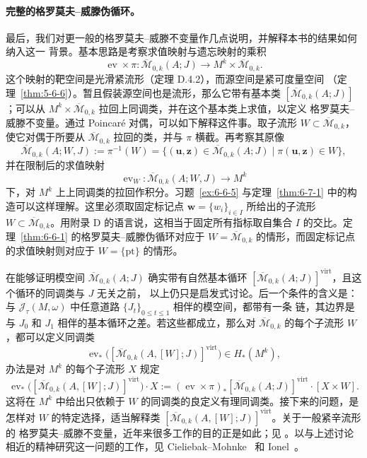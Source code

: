 \paragraph{完整的格罗莫夫--威滕伪循环。}
最后，我们对更一般的格罗莫夫--威滕不变量作几点说明，并解释本书的结果如何纳入这一
背景。基本思路是考察求值映射与遗忘映射的乘积
\[
  \operatorname{ev}\times\pi:
  \overline{\mathcal M}_{0,k}(A;J)
  \longrightarrow M^k\times\overline{\mathcal M}_{0,k}.
\]
这个映射的靶空间是光滑紧流形（定理 D.4.2），而源空间是紧可度量空间
（定理~\ref{thm:5-6-6}）。暂且假装源空间也是流形，那么它带有基本类
$[\overline{\mathcal M}_{0,k}(A;J)]$；可以从
$M^k\times\overline{\mathcal M}_{0,k}$ 拉回上同调类，并在这个基本类上求值，以定义
格罗莫夫--威滕不变量。通过 Poincaré 对偶，可以如下解释这件事。取子流形
$W\subset\overline{\mathcal M}_{0,k}$，使它对偶于所要从
$\overline{\mathcal M}_{0,k}$ 拉回的类，并与 $\pi$ 横截。再考察其原像
\[
  \overline{\mathcal M}_{0,k}(A;W,J)
  :=\pi^{-1}(W)
  =\bigl\{(\mathbf u,\mathbf z)\in\overline{\mathcal M}_{0,k}(A;J)
      \mid\pi(\mathbf u,\mathbf z)\in W\bigr\},
\]
并在限制后的求值映射
\[
  \operatorname{ev}_W:\overline{\mathcal M}_{0,k}(A;W,J)\longrightarrow M^k
\]
下，对 $M^k$ 上上同调类的拉回作积分。习题~\ref{ex:6-6-5} 与定理~\ref{thm:6-7-1}
中的构造可以这样理解。这里必须取固定标记点
$\mathbf w=\{w_i\}_{i\in I}$ 所给出的子流形
$W\subset\overline{\mathcal M}_{0,k}$。用附录 D 的语言说，这相当于固定所有指标取自集合
$I$ 的交比。定理~\ref{thm:6-6-1} 的格罗莫夫--威滕伪循环对应于
$W=\overline{\mathcal M}_{0,k}$ 的情形，而固定标记点的求值映射则对应于
$W=\{\mathrm{pt}\}$ 的情形。

在能够证明模空间 $\overline{\mathcal M}_{0,k}(A;J)$ 确实带有自然基本循环
$[\overline{\mathcal M}_{0,k}(A;J)]^{\mathrm{virt}}$，且这个循环的同调类与 $J$ 无关之前，
以上仍只是启发式讨论。后一个条件的含义是：与
$\mathcal J_\tau(M,\omega)$ 中任意道路 $\{J_t\}_{0\le t\le1}$ 相伴的模空间，都带有一条
链，其边界是与 $J_0$ 和 $J_1$ 相伴的基本循环之差。若这些都成立，那么对
$\overline{\mathcal M}_{0,k}$ 的每个子流形 $W$，都可以定义同调类
\[
  \operatorname{ev}_*\bigl([\overline{\mathcal M}_{0,k}(A,[W];J)]^{\mathrm{virt}}\bigr)
  \in H_*(M^k),
\]
办法是对 $M^k$ 的每个子流形 $X$ 规定
\[
  \operatorname{ev}_*\bigl([\overline{\mathcal M}_{0,k}(A,[W];J)]^{\mathrm{virt}}\bigr)\cdot X
  :=(\operatorname{ev}\times\pi)_*
    [\overline{\mathcal M}_{0,k}(A;J)]^{\mathrm{virt}}\cdot[X\times W].
\]
这将在 $M^k$ 中给出只依赖于 $W$ 的同调类的良定义有理同调类。接下来的问题，是怎样对
$W$ 的特定选择，适当解释类
$[\overline{\mathcal M}_{0,k}(A,[W];J)]^{\mathrm{virt}}$。关于一般紧辛流形的
格罗莫夫--威滕不变量，近年来很多工作的目的正是如此；见
。以与上述讨论相近的精神研究这一问题的工作，见
Cieliebak--Mohnke \, 和 Ionel \,。


